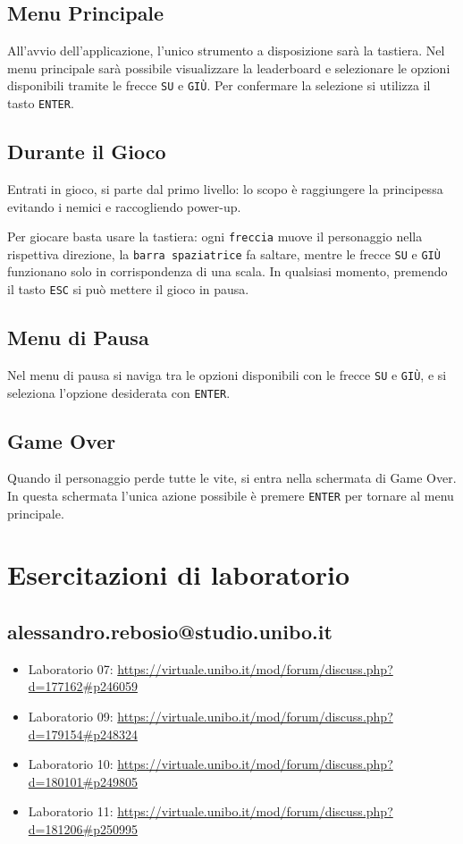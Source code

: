 \documentclass[a4paper,12pt]{report}
\begin{document}
\section{Menu Principale}
All'avvio dell'applicazione, l'unico strumento a disposizione sarà la tastiera. Nel menu principale sarà possibile visualizzare la leaderboard e selezionare le opzioni disponibili
tramite le frecce \texttt{SU} e \texttt{GIÙ}. Per confermare la selezione si utilizza il tasto \texttt{ENTER}.

\section{Durante il Gioco}
Entrati in gioco, si parte dal primo livello: lo scopo è raggiungere la principessa evitando i nemici e raccogliendo power-up.

Per giocare basta usare la tastiera: ogni \texttt{freccia} muove il personaggio nella rispettiva direzione, la \texttt{barra spaziatrice} fa saltare, mentre le frecce \texttt{SU}
e \texttt{GIÙ} funzionano solo in corrispondenza di una scala. In qualsiasi momento, premendo il tasto \texttt{ESC} si può mettere il gioco in pausa.

\section{Menu di Pausa}
Nel menu di pausa si naviga tra le opzioni disponibili con le frecce \texttt{SU} e \texttt{GIÙ}, e si seleziona l'opzione desiderata con \texttt{ENTER}.

\section{Game Over}
Quando il personaggio perde tutte le vite, si entra nella schermata di Game Over. In questa schermata l'unica azione possibile è premere \texttt{ENTER} per tornare al menu principale.

\chapter{Esercitazioni di laboratorio}
\section{alessandro.rebosio@studio.unibo.it}

\begin{itemize}
	\item Laboratorio 07: \url{https://virtuale.unibo.it/mod/forum/discuss.php?d=177162#p246059}
	\item Laboratorio 09: \url{https://virtuale.unibo.it/mod/forum/discuss.php?d=179154#p248324}
	\item Laboratorio 10: \url{https://virtuale.unibo.it/mod/forum/discuss.php?d=180101#p249805}
	\item Laboratorio 11: \url{https://virtuale.unibo.it/mod/forum/discuss.php?d=181206#p250995}
\end{itemize}




\nocite{*}
\end{document}
